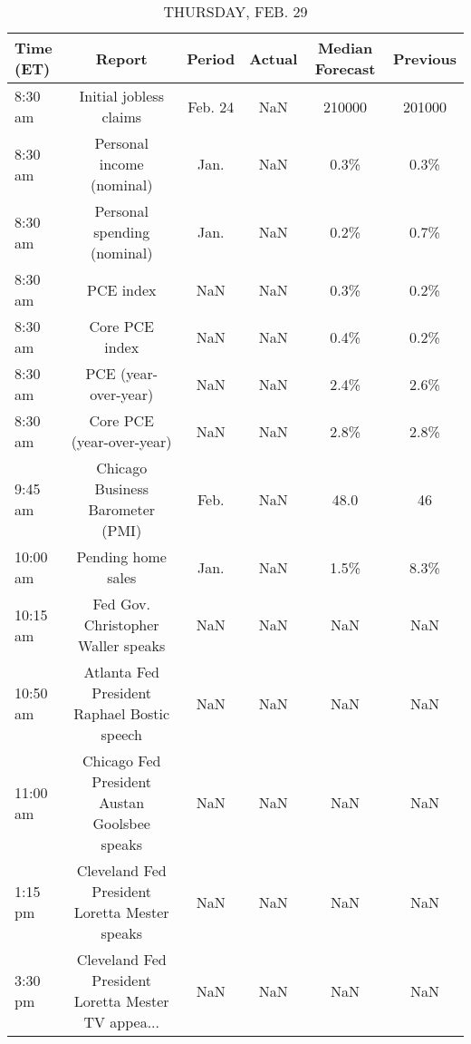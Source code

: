 \documentclass{article}%
\begin{document}
\begin{table}[htbp]%
\caption{THURSDAY, FEB. 29}%
\centering%
\begin{adjustbox}{width=1\textwidth}%
\begin{tabular}{lccccc}
\toprule
Time (ET) &                                             Report &  Period & Actual & Median Forecast & Previous \\
\midrule
  8:30 am &                             Initial jobless claims & Feb. 24 &    NaN &          210000 &   201000 \\
  8:30 am &                          Personal income (nominal) &    Jan. &    NaN &            0.3\% &     0.3\% \\
  8:30 am &                        Personal spending (nominal) &    Jan. &    NaN &            0.2\% &     0.7\% \\
  8:30 am &                                          PCE index &     NaN &    NaN &            0.3\% &     0.2\% \\
  8:30 am &                                     Core PCE index &     NaN &    NaN &            0.4\% &     0.2\% \\
  8:30 am &                               PCE (year-over-year) &     NaN &    NaN &            2.4\% &     2.6\% \\
  8:30 am &                          Core PCE (year-over-year) &     NaN &    NaN &            2.8\% &     2.8\% \\
  9:45 am &                   Chicago Business Barometer (PMI) &    Feb. &    NaN &            48.0 &       46 \\
 10:00 am &                                 Pending home sales &    Jan. &    NaN &            1.5\% &     8.3\% \\
 10:15 am &                 Fed Gov. Christopher Waller speaks &     NaN &    NaN &             NaN &      NaN \\
 10:50 am &        Atlanta Fed President Raphael Bostic speech &     NaN &    NaN &             NaN &      NaN \\
 11:00 am &       Chicago Fed President Austan Goolsbee speaks &     NaN &    NaN &             NaN &      NaN \\
  1:15 pm &      Cleveland Fed President Loretta Mester speaks &     NaN &    NaN &             NaN &      NaN \\
  3:30 pm & Cleveland Fed President Loretta Mester TV appea... &     NaN &    NaN &             NaN &      NaN \\
\bottomrule
\end{tabular}
%
\end{adjustbox}%
\end{table}
\end{document}
